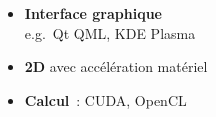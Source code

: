 \begin{frame}
\begin{columns}
\begin{column}{.5\textwidth}
\begin{itemize}
      \item \textbf{Interface graphique} \\
        e.g.\ Qt QML, KDE Plasma
      \item \textbf{2D} avec accélération matériel
      \item \textbf{Calcul}~: CUDA, OpenCL
      \end{itemize}
    \end{column}
  \end{columns}
\end{frame}

